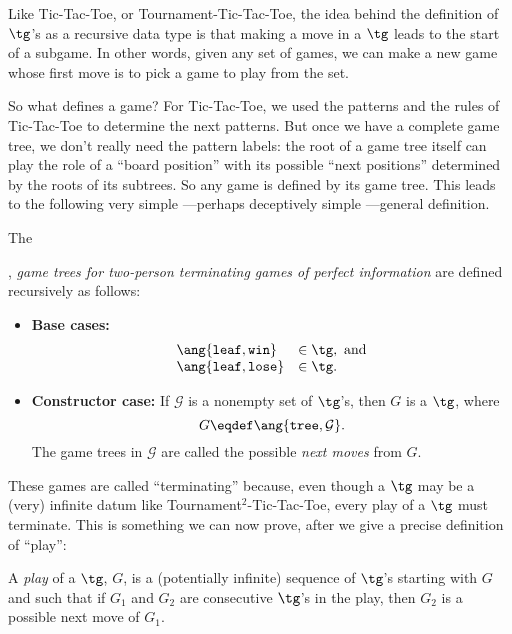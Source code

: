 \begin{definition}
\begin{staffnotes}
\end{staffnotes}

Like Tic-Tac-Toe, or Tournament-Tic-Tac-Toe, the idea behind the
definition of $\tg$'s as a recursive data type is that making a move
in a $\tg$ leads to the start of a subgame.  In other words, given any
set of games, we can make a new game whose first move is to pick a
game to play from the set.

So what defines a game?  For Tic-Tac-Toe, we used the patterns and the
rules of Tic-Tac-Toe to determine the next patterns.  But once we have
a complete game tree, we don't really need the pattern labels: the
root of a game tree itself can play the role of a ``board position''
with its possible ``next positions'' determined by the roots of its
subtrees.  So any game is defined by its game tree.  This leads to the
following very simple ---perhaps deceptively simple ---general
definition.

\begin{definition}
The , \emph{game trees for two-person terminating
    games of perfect information} are defined recursively as follows:
\begin{itemize}

\item \textbf{Base cases:}
\[\begin{array}{ll}
\ang{\texttt{leaf},\texttt{win}} & \in \tg, \text{ and}\\
\ang{\texttt{leaf},\texttt{lose}}& \in \tg.
\end{array}\]

\item \textbf{Constructor case:}
If $\mathcal{G}$ is a nonempty set of
$\tg$'s, then $G$ is a $\tg$, where
\[
G \eqdef \ang{\texttt{tree},\mathcal{G}}.
\]
The game trees in $\mathcal{G}$ are called the possible \emph{next moves}
from $G$.
\end{itemize}

\end{definition}

These games are called ``terminating'' because, even though a $\tg$ may be
a (very) infinite datum like Tournament$^2$-Tic-Tac-Toe, every play of a
$\tg$ must terminate.  This is something we can now prove, after we give a
precise definition of ``play'':

\begin{definition}
A \emph{play} of a $\tg$, $G$, is a (potentially infinite) sequence of
$\tg$'s starting with $G$ and such that if $G_1$ and $G_2$ are consecutive
$\tg$'s in the play, then $G_2$ is a possible next move of $G_1$.


\end{definition}
\end{definition}
